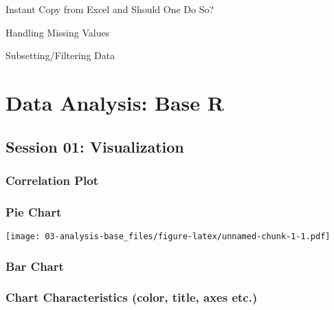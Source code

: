 \documentclass[
]{book}
\newenvironment{Shaded}{\begin{snugshade}}{\end{snugshade}}
\newcommand{\DataTypeTok}[1]{\textcolor[rgb]{0.13,0.29,0.53}{#1}}
\newcommand{\DecValTok}[1]{\textcolor[rgb]{0.00,0.00,0.81}{#1}}
\newcommand{\KeywordTok}[1]{\textcolor[rgb]{0.13,0.29,0.53}{\textbf{#1}}}
\newcommand{\NormalTok}[1]{#1}
\newcommand{\OtherTok}[1]{\textcolor[rgb]{0.56,0.35,0.01}{#1}}
\newcommand{\StringTok}[1]{\textcolor[rgb]{0.31,0.60,0.02}{#1}}
\begin{document}
Instant Copy from Excel and Should One Do So?

Handling Missing Values

Subsetting/Filtering Data

\hypertarget{rbase}{%
\chapter{Data Analysis: Base R}\label{rbase}}

\hypertarget{session-01-visualization}{%
\section{Session 01: Visualization}\label{session-01-visualization}}

\hypertarget{correlation-plot}{%
\subsection{Correlation Plot}\label{correlation-plot}}

\hypertarget{pie-chart}{%
\subsection{Pie Chart}\label{pie-chart}}

\begin{Shaded}
\end{Shaded}

\texttt{[image: 03-analysis-base\_files/figure-latex/unnamed-chunk-1-1.pdf]}

\hypertarget{bar-chart}{%
\subsection{Bar Chart}\label{bar-chart}}

\hypertarget{chart-characteristics-color-title-axes-etc.}{%
\subsection{Chart Characteristics (color, title, axes etc.)}\label{chart-characteristics-color-title-axes-etc.}}
\end{document}
